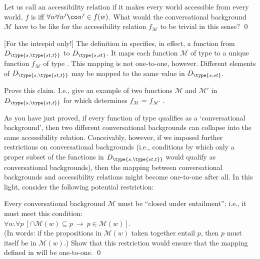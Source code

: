 \begin{exercise}
	
	Let us call an accessibility relation  if it makes
  every world accessible from every world. $f$ is  iff
  $\forall w\forall w'\co w'\in f(w)$. What would the conversational
  background $\mathcal{M}$ have to be like for the accessibility relation
  $f_{\mathcal{M}}$ to be trivial in this sense? \qed
\end{exercise}

\begin{exercise}\label{closure}
	
	[For the intrepid only!] The definition in  specifies, in
  effect, a function from $D_{\type{s,\type{st,t}}}$ to $D_{\type{s,st}}$. It
  maps each function $\mathcal{M}$ of type  to a unique
  function $f_{\mathcal{M}}$ of type . This mapping is not
  one-to-one, however. Different elements of $D_{\type{s,\type{st,t}}}$ may be
  mapped to the same value in $D_{\type{s,st}}$.

  Prove this claim. I.e., give an example of two functions $\mathcal{M}$ and
  $\mathcal{M}'$ in $D_{\type{s,\type{st,t}}}$ for which 
  determines $f_{\mathcal{M}}$ = $f_{\mathcal{M}'}$ .
		
  As you have just proved, if every function of type 
  qualifies as a `conversational background', then two different conversational
  backgrounds can collapse into the same accessibility relation. Conceivably,
  however, if we imposed further restrictions on conversational backgrounds
  (i.e., conditions by which only a proper subset of the functions in
  $D_{\type{s,\type{st,t}}}$ would qualify as conversational backgrounds), then
  the mapping between conversational backgrounds and accessibility relations
  might become one-to-one after all. In this light, consider the following
  potential restriction:

	\ex Every conversational background $\mathcal{M}$ must be ``closed under
  entailment''; i.e., it must meet this condition:\\
  $\forall w. \forall p\ [ \ensuremath{\cap}\mathcal{M}(w)
  \ensuremath{\subseteq} p\
  \rightarrow\ p \in \mathcal{M}(w) ]$.\\
  (In words: if the propositions in $\mathcal{M}(w)$ taken together entail $p$,
  then $p$ must itself be in $\mathcal{M}(w)$.) \xe
  Show that this restriction would ensure that the mapping defined in
  \refx{convers} will be one-to-one. \qed
\end{exercise} 

